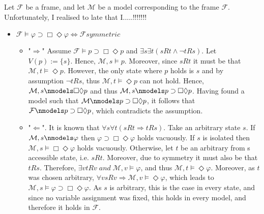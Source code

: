 \documentclass[11pt,a4paper]{article}
\newcommand{\lto}{\supset}
\newcommand{\some}{\Diamond}
\newcommand{\all}{\Box}
\newcommand{\sand}{\; and \;}
\newcommand{\sto}{\Rightarrow}
\begin{document}
Let $\mathcal{F}$ be a frame, and let $\mathcal{M}$ be a model corresponding to the frame $\mathcal{F}$. Unfortunately, I realised to late that I.....!!!!!!! 
\begin{itemize}
\item $\mathcal{F} \models \varphi \lto \all \some \varphi \iff \mathcal{F} \mathit{symmetric}$ 
\begin{itemize}
\item "$\Rightarrow$" Assume $\mathcal{F} \models p \lto \all \some p $ and $\exists s \exists t (sRt \land \neg tRs)$. Let $V(p):=\{s\}$. Hence, $\mathcal{M},s \models p$. Moreover, since $sRt$ it must be that $\mathcal{M},t \models \some p$. However, the only state where $p$ holds is $s$ and by assumption $\neg tRs$, thus $\mathcal{M},t \models \some p$ can not hold. Hence, $\mathcal{M}, s \nmodels \all \some p$ and thus $\mathcal{M}, s \nmodels p \lto \all \some p$. Having found a model such that $\mathcal{M} \nmodels  p \lto \all \some p $, it follows that $\mathcal{F} \nmodels  p \lto \all \some p $, which contradicts the assumption.
\item "$\Leftarrow$". It is known that $\forall s \forall t (sRt \sto tRs)$. Take an arbitrary state $s$. If $\mathcal{M},s \nmodels \varphi$ then $\varphi \lto \all \some \varphi $ holds vacuously. If $s$ is isolated then $\mathcal{M},s \models \all \some \varphi$ holds vacuously. Otherwise, let $t$ be an arbitrary from s accessible state, i.e. $sRt$. Moreover, due to symmetry it must also be that $tRs$. Therefore, $\exists v tRv \sand \mathcal{M}, v \models \varphi $, and thus $\mathcal{M}, t \models \some \varphi$. Moreover, as $t$ was chosen arbitrary, $\forall v sRv \sto \mathcal{M}, v \models \some \varphi$, which leads to $\mathcal{M}, s \models \varphi \lto \all \some \varphi$. As $s$ is arbitrary, this is the case in every state, and since no variable assignment was fixed, this holds in every model, and therefore it holds in $\mathcal{F}$.
\end{itemize}


\end{itemize}
\end{document}
